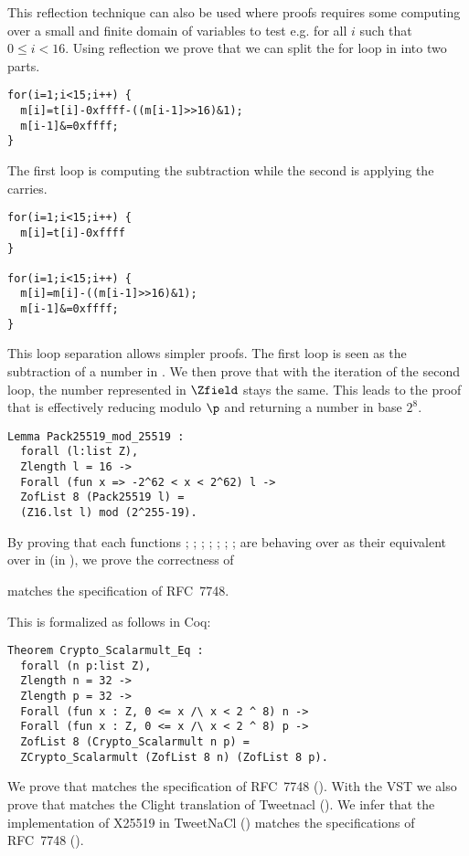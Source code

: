 This reflection technique can also be used where proofs requires some computing
over a small and finite domain of variables to test e.g. for all $i$ such that $0 \le i < 16$.
Using reflection we prove that we can split the for loop in  into two parts.
\begin{lstlisting}[language=Ctweetnacl]
for(i=1;i<15;i++) {
  m[i]=t[i]-0xffff-((m[i-1]>>16)&1);
  m[i-1]&=0xffff;
}
\end{lstlisting}
The first loop is computing the subtraction while the second is applying the carries.
\begin{lstlisting}[language=Ctweetnacl]
for(i=1;i<15;i++) {
  m[i]=t[i]-0xffff
}

for(i=1;i<15;i++) {
  m[i]=m[i]-((m[i-1]>>16)&1);
  m[i-1]&=0xffff;
}
\end{lstlisting}

This loop separation allows simpler proofs. The first loop is seen as the subtraction of a number in \Zfield.
We then prove that with the iteration of the second loop, the number represented in $\Zfield$ stays the same.
This leads to the proof that  is effectively reducing modulo $\p$ and returning a number in base $2^8$.
\begin{lstlisting}[language=Coq]
Lemma Pack25519_mod_25519 :
  forall (l:list Z),
  Zlength l = 16 ->
  Forall (fun x => -2^62 < x < 2^62) l ->
  ZofList 8 (Pack25519 l) =
  (Z16.lst l) mod (2^255-19).
\end{lstlisting}

By proving that each functions ; ; ; ;
; ; ;  are behaving over 
as their equivalent over  in  (in \Zfield), we prove the correctness of

\begin{theorem}
  \label{thm:crypto-rfc}
 matches the specification of RFC~7748.
\end{theorem}

This is formalized as follows in Coq:
\begin{lstlisting}[language=Coq]
Theorem Crypto_Scalarmult_Eq :
  forall (n p:list Z),
  Zlength n = 32 ->
  Zlength p = 32 ->
  Forall (fun x : Z, 0 <= x /\ x < 2 ^ 8) n ->
  Forall (fun x : Z, 0 <= x /\ x < 2 ^ 8) p ->
  ZofList 8 (Crypto_Scalarmult n p) =
  ZCrypto_Scalarmult (ZofList 8 n) (ZofList 8 p).
\end{lstlisting}

We prove that  matches the specification of RFC~7748 ().
With the VST we also prove that  matches the Clight translation of Tweetnacl ().
We infer that the implementation of X25519 in TweetNaCl () matches
the specifications of RFC~7748 ().
